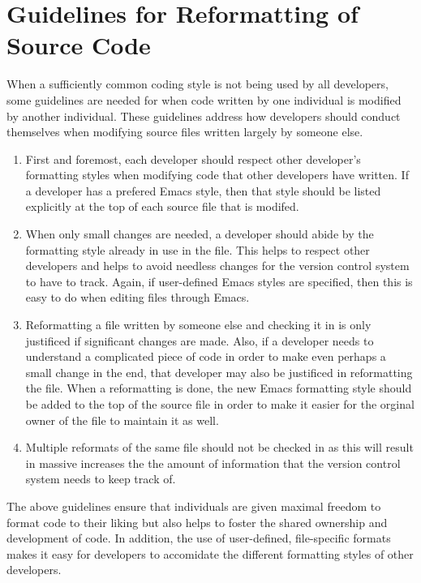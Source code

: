 %
\section{Guidelines for Reformatting of Source Code}
%

When a sufficiently common coding style is not being used by all developers,
some guidelines are needed for when code written by one individual is modified
by another individual.  These guidelines address how developers should conduct
themselves when modifying source files written largely by someone else.

\begin{enumerate}

{}\item First and foremost, each developer should respect other developer's
formatting styles when modifying code that other developers have written.  If
a developer has a prefered Emacs style, then that style should be listed
explicitly at the top of each source file that is modifed.

{}\item When only small changes are needed, a developer should abide by the
formatting style already in use in the file.  This helps to respect other
developers and helps to avoid needless changes for the version control system
to have to track.  Again, if user-defined Emacs styles are specified, then
this is easy to do when editing files through Emacs.

{}\item Reformatting a file written by someone else and checking it in is only
justificed if significant changes are made.  Also, if a developer needs to
understand a complicated piece of code in order to make even perhaps a small
change in the end, that developer may also be justificed in reformatting the
file.  When a reformatting is done, the new Emacs formatting style should be
added to the top of the source file in order to make it easier for the orginal
owner of the file to maintain it as well.

{}\item Multiple reformats of the same file should not be checked in as this
will result in massive increases the the amount of information that the
version control system needs to keep track of.

\end{enumerate}

The above guidelines ensure that individuals are given maximal freedom to
format code to their liking but also helps to foster the shared ownership and
development of code.  In addition, the use of user-defined, file-specific
formats makes it easy for developers to accomidate the different formatting
styles of other developers.
